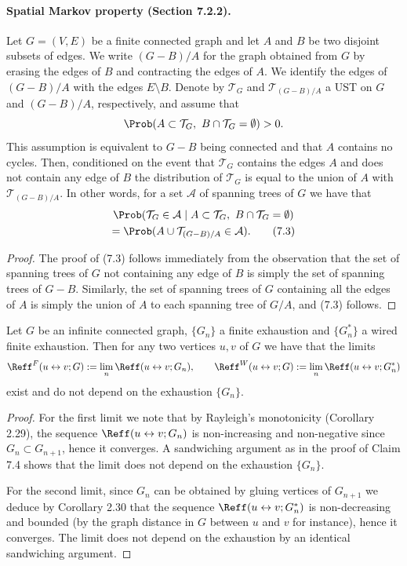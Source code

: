 \paragraph{Spatial Markov property (Section 7.2.2).}
Let $G=(V,E)$ be a finite connected graph and let $A$ and $B$ be two disjoint subsets of edges. We write $(G-B)/A$ for the graph obtained from $G$ by erasing the edges of $B$ and contracting the edges of $A$. We identify the edges of $(G-B)/A$ with the edges $E\setminus B$. Denote by $\mathcal T_G$ and $\mathcal T_{(G-B)/A}$ a UST on $G$ and $(G-B)/A$, respectively, and assume that
\[
\Prob(A\subset\mathcal T_G,\ B\cap\mathcal T_G=\emptyset)>0.
\]
This assumption is equivalent to $G-B$ being connected and that $A$ contains no cycles.
Then, conditioned on the event that $\mathcal T_G$ contains the edges $A$ and does not contain any edge of $B$ the distribution of $\mathcal T_G$ is equal to the union of $A$ with $\mathcal T_{(G-B)/A}$. In other words, for a set $\mathcal A$ of spanning trees of $G$ we have that
\begin{multline*}
\Prob(\mathcal T_G\in\mathcal A\mid A\subset\mathcal T_G,\ B\cap\mathcal T_G=\emptyset)\\
=\Prob(A\cup\mathcal T_{(G-B)/A}\in\mathcal A).\tag{7.3}
\end{multline*}
\begin{proof}
The proof of (7.3) follows immediately from the observation that the set of spanning trees of $G$ not containing any edge of $B$ is simply the set of spanning trees of $G-B$. Similarly, the set of spanning trees of $G$ containing all the edges of $A$ is simply the union of $A$ to each spanning tree of $G/A$, and (7.3) follows.
\end{proof}

\begin{claim}[7.4]
Let $G$ be an infinite connected graph, $\{G_n\}$ a finite exhaustion and $\{G_n^*\}$ a wired finite exhaustion. Then for any two vertices $u,v$ of $G$ we have that the limits
\[
\Reff^F(u\leftrightarrow v;G):=\lim_n\Reff(u\leftrightarrow v;G_n),
\qquad
\Reff^W(u\leftrightarrow v;G):=\lim_n\Reff(u\leftrightarrow v;G_n^*)
\]
exist and do not depend on the exhaustion $\{G_n\}$.
\end{claim}
\begin{proof}
For the first limit we note that by Rayleigh's monotonicity (Corollary 2.29), the sequence $\Reff(u\leftrightarrow v;G_n)$ is non-increasing and non-negative since $G_n\subset G_{n+1}$, hence it converges. A sandwiching argument as in the proof of Claim 7.4 shows that the limit does not depend on the exhaustion $\{G_n\}$.

For the second limit, since $G_n$ can be obtained by gluing vertices of $G_{n+1}$ we deduce by Corollary 2.30 that the sequence $\Reff(u\leftrightarrow v;G_n^*)$ is non-decreasing and bounded (by the graph distance in $G$ between $u$ and $v$ for instance), hence it converges. The limit does not depend on the exhaustion by an identical sandwiching argument.
\end{proof}

